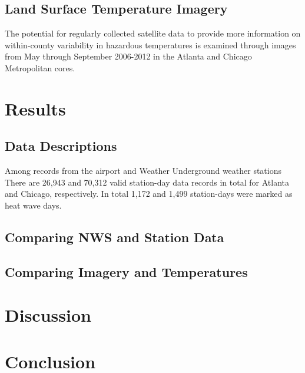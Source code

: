 \documentclass{ametsoc}
\begin{document}
\subsection{Land Surface Temperature Imagery}\label{subsec:WUNDERdata}
The potential for regularly collected satellite data to provide more information on within-county variability in hazardous temperatures is examined through images from May through September 2006-2012 in the Atlanta and Chicago Metropolitan cores. 

\section{Results}\label{section:results}
\subsection{Data Descriptions}\label{subsec:descriptions}
Among records from the airport and Weather Underground weather stations There are 26,943 and 70,312 valid station-day data records in total for Atlanta and Chicago, respectively.  In total 1,172 and 1,499 station-days were marked as heat wave days.



\subsection{Comparing NWS and Station Data}\label{subsec:hyp1}

\subsection{Comparing Imagery and Temperatures}\label{subsec:LST}

\section{Discussion}\label{section:discussion}



\section{Conclusion}\label{section:conclusion}



%
\end{document}

